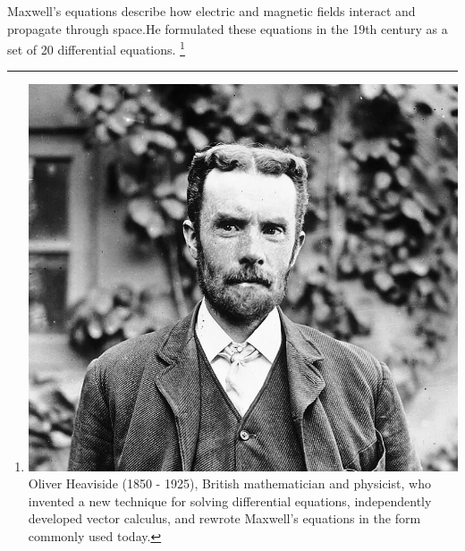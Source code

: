 Maxwell's equations describe how electric and magnetic fields interact and propagate through space.He formulated these equations in the 19th century as a set of 20 differential equations. 
\footnote{
\includegraphics[scale=0.1]{graphics/oliver} 
Oliver Heaviside (1850 - 1925), British mathematician and physicist, who invented a new technique for solving differential equations, independently developed vector calculus, and rewrote Maxwell's equations in the form commonly used today.
}

